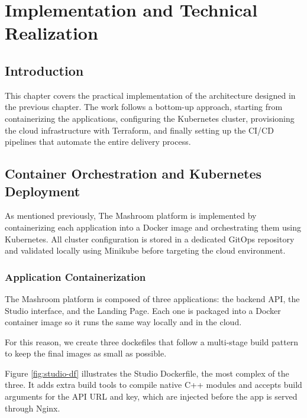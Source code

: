 \chapter{Implementation and Technical Realization}
\minitoc
\newpage

\setcounter{secnumdepth}{0} %
\section{Introduction}
This chapter covers the practical implementation of the architecture 
designed in the previous chapter. The work follows a bottom-up approach, 
starting from containerizing the applications, configuring the Kubernetes 
cluster, provisioning the cloud infrastructure with Terraform, and finally 
setting up the CI/CD pipelines that automate the entire delivery process.

\setcounter{secnumdepth}{3}

\section{Container Orchestration and Kubernetes Deployment}
As mentioned previously, The Mashroom platform is implemented by containerizing each application 
into a Docker image and orchestrating them using Kubernetes. All cluster 
configuration is stored in a dedicated GitOps repository and validated 
locally using Minikube before targeting the cloud environment.

\subsection{Application Containerization}
The Mashroom platform is composed of three applications: the 
backend API, the Studio interface, and the Landing Page. Each 
one is packaged into a Docker container image so it runs the 
same way locally and in the cloud.

For this reason, we create three dockefiles that follow a multi-stage build pattern to keep the 
final images as small as possible.

Figure \ref{fig:studio-df} illustrates the Studio Dockerfile, the most 
complex of the three. It adds extra build tools to compile native C++ 
modules and accepts build arguments for the API URL and key, which are 
injected before the app is served through Nginx.

